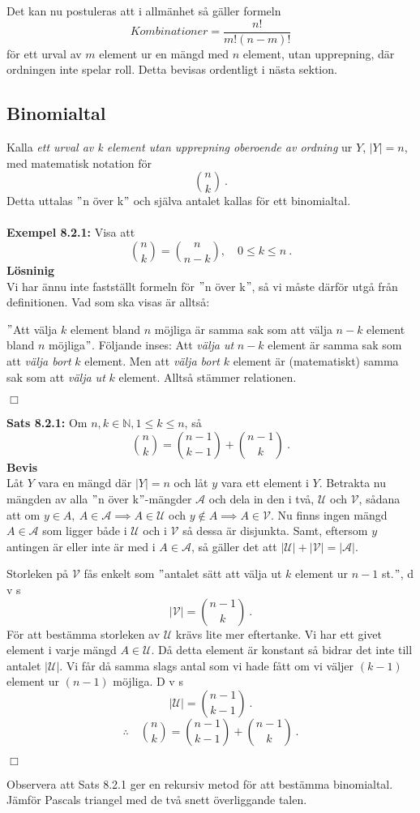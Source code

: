 \documentclass{article}
\begin{document}
Det kan nu postuleras att i allmänhet så gäller formeln
$$
Kombinationer=\frac{n!}{m!(n-m)!}
$$
för ett urval av $m$ element ur en mängd med $n$ element, utan upprepning, där ordningen inte spelar roll. Detta bevisas ordentligt i nästa sektion.

\subsection{Binomialtal}
Kalla \textit{ett urval av k element utan upprepning oberoende av ordning} ur $Y$, $|Y|=n$, med matematisk notation för
$$
{n \choose k} \ .
$$
Detta uttalas $"$n över k$"$ och själva antalet kallas för ett binomialtal.\\ \\
\textbf{Exempel 8.2.1:} Visa att
$$
{n \choose k}={n \choose n-k}, \quad 0\leq k\leq n \ .
$$
\textbf{Lösninig}\\
Vi har ännu inte fastställt formeln för $"$n över k$"$, så vi måste därför utgå från definitionen. Vad som ska visas är alltså:

$"$Att välja $k$ element bland $n$ möjliga är samma sak som att välja $n-k$ element bland $n$ möjliga$"$. Följande inses: Att \textit{välja ut} $n-k$ element är samma sak som att \textit{välja bort} $k$ element. Men att \textit{välja bort} $k$ element är (matematiskt) samma sak som att \textit{välja ut} $k$ element. Alltså stämmer relationen.
\begin{flushright}
$\Box$
\end{flushright}
\textbf{Sats 8.2.1:} Om $n,k\in\mathbb{N}, 1\leq k\leq n$, så 
$$
{n \choose k}={n-1 \choose k-1}+{n-1 \choose k} \ .
$$
\textbf{Bevis}\\
Låt $Y$ vara en mängd där $|Y|=n$ och låt $y$ vara ett element i $Y$. Betrakta nu mängden av alla $"$n över k$"$-mängder $\mathcal{A}$ och dela in den i två, $\mathcal{U}$ och $\mathcal{V}$, sådana att om $y\in A, \ A\in\mathcal{A}\implies A\in\mathcal{U}$ och $y\notin A\implies A\in \mathcal{V}$. Nu finns ingen mängd $A\in\mathcal{A}$ som ligger både i $\mathcal{U}$ och i $\mathcal{V}$ så dessa är disjunkta. Samt, eftersom $y$ antingen är eller inte är med i $A\in\mathcal{A}$, så gäller det att $|\mathcal{U}|+|\mathcal{V}|=|\mathcal{A}|$. 

Storleken på $\mathcal{V}$ fås enkelt som $"$antalet sätt att välja ut $k$ element ur $n-1$ st.$"$, d v s
$$
|\mathcal{V}|={n-1 \choose k} \ .
$$
För att bestämma storleken av $\mathcal{U}$ krävs lite mer eftertanke. Vi har ett givet element i varje mängd $A\in\mathcal{U}$. Då detta element är konstant så bidrar det inte till antalet $|\mathcal{U}|$. Vi får då samma slags antal som vi hade fått om vi väljer $(k-1)$ element ur $(n-1)$ möjliga. D v s
$$
|\mathcal{U}|={n-1 \choose k-1} \ .
$$
$$
\therefore \quad {n \choose k}={n-1 \choose k-1}+{n-1 \choose k} \ .
$$
\begin{flushright}
$\Box$
\end{flushright}
Observera att Sats 8.2.1 ger en rekursiv metod för att bestämma binomialtal. Jämför Pascals triangel med de två snett överliggande talen.
\end{document}
